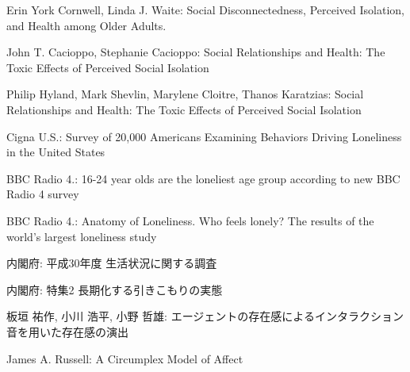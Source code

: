 \documentclass[a4paper,dvipdfmx]{hisken}
\begin{document}
\begin{thebibliography}{99}
	Erin York Cornwell, Linda J. Waite:
	Social Disconnectedness, Perceived Isolation, and Health among Older Adults.
	
	John T. Cacioppo, Stephanie Cacioppo:
	Social Relationships and Health: The Toxic Effects of Perceived Social Isolation
	
	Philip Hyland, Mark Shevlin, Marylene Cloitre, Thanos Karatzias:
	Social Relationships and Health: The Toxic Effects of Perceived Social Isolation
	
	Cigna U.S.:
	Survey of 20,000 Americans Examining Behaviors Driving Loneliness in the United States
	
	BBC Radio 4.:
	16-24 year olds are the loneliest age group according to new BBC Radio 4 survey
	
	BBC Radio 4.:
	Anatomy of Loneliness. Who feels lonely? The results of the world’s largest loneliness study
	
	内閣府:
	平成30年度 生活状況に関する調査
	
	内閣府:
	特集2 長期化する引きこもりの実態
	
	板垣 祐作, 小川 浩平, 小野 哲雄:
	エージェントの存在感によるインタラクション 音を用いた存在感の演出
	
	James A. Russell:
	A Circumplex Model of Affect
	
\end{thebibliography}





\end{document}
